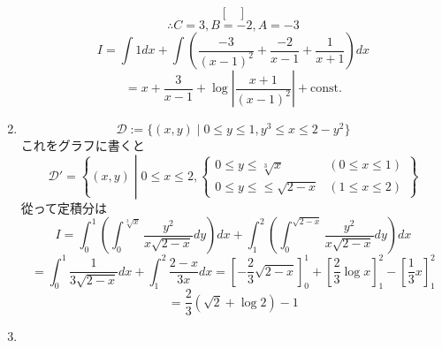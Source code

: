 \documentclass[a4paper,10pt,report]{amsart}
\theoremstyle{plain}
\theoremstyle{definition}
\theoremstyle{remark}
\begin{document}
\begin{enumerate}
\begin{equation*}
\begin{bmatrix}
            \end{bmatrix}
        \end{equation*}
        \begin{equation*}
            \therefore C=3,B=-2,A=-3
        \end{equation*}
        \begin{equation*}
            I=\int1dx+\int\left(\frac{-3}{{(x-1)}^{2}}+\frac{-2}{x-1}+\frac{1}{x+1}\right)dx
        \end{equation*}
        \begin{equation*}
            =x+\frac{3}{x-1}+\log\left|\frac{x+1}{{(x-1)}^{2}}\right|+\mathrm{const.}
        \end{equation*}
        \item
        \begin{equation*}
            \mathcal{D}:=\{(x,y)\mid0\leq y\leq 1,y^{3}\leq x\leq 2-y^{2}\}
        \end{equation*}
        これをグラフに書くと
        \begin{equation*}
            \mathcal{D}'=\left \{(x,y)\middle|0\leq x\leq 2,
            \begin{cases}
                0\leq y\leq \sqrt[3]{x}&(0\leq x\leq 1) \\
                0\leq y\leq \leq \sqrt{2-x}&(1\leq x\leq 2)
            \end{cases}
            \right \}
        \end{equation*}
        從って定積分は
        \begin{equation*}
            I=\int_{0}^{1}\left(\int_{0}^{\sqrt[3]{x}}\frac{y^{2}}{x\sqrt{2-x}}dy\right)dx+\int_{1}^{2}\left(\int_{0}^{\sqrt{2-x}}\frac{y^{2}}{x\sqrt{2-x}}dy\right)dx
        \end{equation*}
        \begin{equation*}
            =\int_{0}^{1}\frac{1}{3\sqrt{2-x}}dx+\int_{1}^{2}\frac{2-x}{3x}dx={\left[-\frac{2}{3}\sqrt{2-x}\right]}_{0}^{1}+\left[\frac{2}{3}\log{}x\right]_{1}^{2}-\left[\frac{1}{3}x\right]_{1}^{2}
        \end{equation*}
        \begin{equation*}
            =\frac{2}{3}(\sqrt{2}+\log{2})-1
        \end{equation*}
        \item 
    \end{enumerate}
\end{document}
